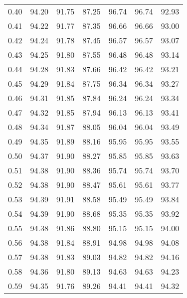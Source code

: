 \begin{tabular}{|c|c|c|c|c|c|c|}
      0.40 &     94.20 &     91.75 &      87.25 &   96.74 &      96.74 &         92.93 \\
      0.41 &     94.22 &     91.77 &      87.35 &   96.66 &      96.66 &         93.00 \\
      0.42 &     94.24 &     91.78 &      87.45 &   96.57 &      96.57 &         93.07 \\
      0.43 &     94.25 &     91.80 &      87.55 &   96.48 &      96.48 &         93.14 \\
      0.44 &     94.28 &     91.83 &      87.66 &   96.42 &      96.42 &         93.21 \\
      0.45 &     94.29 &     91.84 &      87.75 &   96.34 &      96.34 &         93.27 \\
      0.46 &     94.31 &     91.85 &      87.84 &   96.24 &      96.24 &         93.34 \\
      0.47 &     94.32 &     91.85 &      87.94 &   96.13 &      96.13 &         93.41 \\
      0.48 &     94.34 &     91.87 &      88.05 &   96.04 &      96.04 &         93.49 \\
      0.49 &     94.35 &     91.89 &      88.16 &   95.95 &      95.95 &         93.55 \\
      0.50 &     94.37 &     91.90 &      88.27 &   95.85 &      95.85 &         93.63 \\
      0.51 &     94.38 &     91.90 &      88.36 &   95.74 &      95.74 &         93.70 \\
      0.52 &     94.38 &     91.90 &      88.47 &   95.61 &      95.61 &         93.77 \\
      0.53 &     94.39 &     91.91 &      88.58 &   95.49 &      95.49 &         93.84 \\
      0.54 &     94.39 &     91.90 &      88.68 &   95.35 &      95.35 &         93.92 \\
      0.55 &     94.38 &     91.86 &      88.80 &   95.15 &      95.15 &         94.00 \\
      0.56 &     94.38 &     91.84 &      88.91 &   94.98 &      94.98 &         94.08 \\
      0.57 &     94.38 &     91.83 &      89.03 &   94.82 &      94.82 &         94.16 \\
      0.58 &     94.36 &     91.80 &      89.13 &   94.63 &      94.63 &         94.23 \\
      0.59 &     94.35 &     91.76 &      89.26 &   94.41 &      94.41 &         94.32 \\

\end{tabular}
